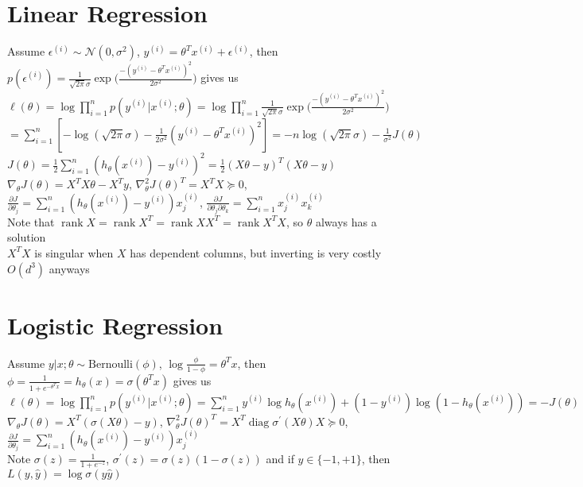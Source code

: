 \documentclass{article}
\newcommand{\N}{\mathcal{N}}
\DeclareMathOperator{\rank}{rank}
\DeclareMathOperator{\diag}{diag}
\begin{document}
\section{Linear Regression}
Assume $\epsilon^{(i)} \sim \N(0, \sigma^2)$, $y^{(i)} = \theta^Tx^{(i)} + \epsilon^{(i)}$, then $p(\epsilon^{(i)}) = \frac{1}{\sqrt{2 \pi} \sigma} \exp \big ({\frac{-(y^{(i)} - \theta^T x^{(i)})^2}{2\sigma^2}} \big)$ gives us \\
$\ell(\theta) = \log \prod\limits_{i=1}^n p(y^{(i)} | x^{(i)} ; \theta) = \log \prod\limits_{i=1}^n \frac{1}{\sqrt{2 \pi} \sigma} \exp \big ({\frac{-(y^{(i)} - \theta^T x^{(i)})^2}{2\sigma^2}} \big) $ \\
\hspace*{0.577cm} $ = \sum\limits_{i=1}^n [-\log(\sqrt{2\pi}\sigma) - \frac{1}{2\sigma^2} (y^{(i)} - \theta^T x^{(i)})^2] = -n\log(\sqrt{2\pi}\sigma) - \frac{1}{\sigma^2} J(\theta) $ \\
$J(\theta) = \frac{1}{2} \sum\limits_{i=1}^n (h_\theta(x^{(i)}) - y^{(i)})^2 = \frac{1}{2} (X\theta - y)^T(X\theta - y)$ \\
$\nabla_\theta J(\theta) = X^TX\theta - X^Ty$, $\nabla_\theta^2 J(\theta)^T = X^TX \succeq 0$, $\frac{\partial J}{\partial \theta_j} = \sum\limits_{i=1}^n (h_\theta(x^{(i)}) - y^{(i)})x_j^{(i)}$, $\frac{\partial J}{\partial \theta_j \partial\theta_k} = \sum\limits_{i=1}^n x_j^{(i)}x_k^{(i)}$ \\
Note that $\rank X = \rank X^T = \rank XX^T = \rank X^TX $, so $\theta$ always has a solution \\
$X^TX$ is singular when $X$ has dependent columns, but inverting is very costly $O(d^3)$ anyways

\section{Logistic Regression}
Assume $y|x ; \theta \sim \mbox{Bernoulli}(\phi)$, $\log \frac{\phi}{1-\phi} = \theta^T x$, then $\phi = \frac{1}{1+e^{-\theta^T x}} = h_\theta(x) = \sigma(\theta^Tx) $ gives us \\
$\ell(\theta) =\log \prod\limits_{i=1}^n p(y^{(i)} | x^{(i)} ; \theta) = \sum\limits_{i=1}^n y^{(i)}\log h_\theta(x^{(i)}) + (1-y^{(i)})\log (1-h_\theta(x^{(i)})) = - J(\theta)$ \\
$\nabla_\theta J(\theta) = X^T (\sigma(X\theta) - y)$, $\nabla_\theta^2 J(\theta)^T =  X^T \diag \sigma^\prime (X\theta)X \succeq 0$, $\frac{\partial J}{\partial \theta_j} = \sum\limits_{i=1}^n (h_\theta(x^{(i)}) - y^{(i)})x_j^{(i)}$ \\
Note $\sigma(z) = \frac{1}{1+e^{-z}}$, $\sigma^\prime(z) = \sigma(z)(1-\sigma(z))$ and if $y \in \{-1, +1\}$, then $L(y, \hat y) =\log \sigma(y\hat y)$
\end{document}
